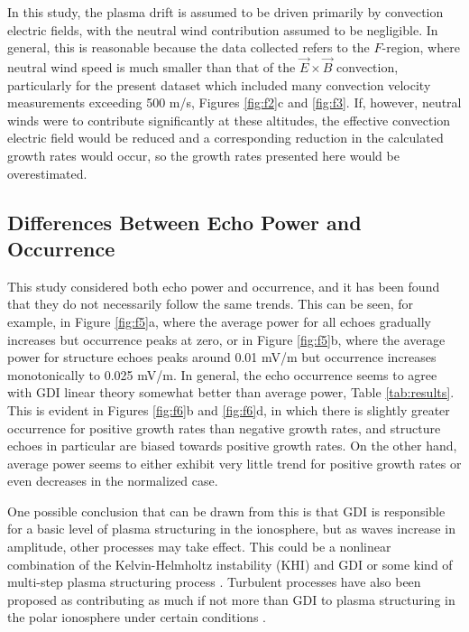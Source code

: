 In this study, the plasma drift is assumed to be driven primarily by convection electric fields, with the neutral wind contribution assumed to be negligible.  In general, this is reasonable because the data collected refers to the \(F\)-region, where neutral wind speed is much smaller than that of the \(\vec{E}\times\vec{B}\) convection, particularly for the present dataset which included many convection velocity measurements exceeding 500 m/s, Figures \ref{fig:f2}c and \ref{fig:f3}.  If, however, neutral winds were to contribute significantly at these altitudes, the effective convection electric field would be reduced and a corresponding reduction in the calculated growth rates would occur, so the growth rates presented here would be overestimated.


\subsection{Differences Between Echo Power and Occurrence}
\label{sec:discussion3}
This study considered both echo power and occurrence, and it has been found that they do not necessarily follow the same trends.  This can be seen, for example, in Figure \ref{fig:f5}a, where the average power for all echoes gradually increases but occurrence peaks at zero, or in Figure \ref{fig:f5}b, where the average power for structure echoes peaks around 0.01 mV/m but occurrence increases monotonically to 0.025 mV/m.  In general, the echo occurrence seems to agree with GDI linear theory somewhat better than average power, Table \ref{tab:results}.  This is evident in Figures \ref{fig:f6}b and \ref{fig:f6}d, in which there is slightly greater occurrence for positive growth rates than negative growth rates, and structure echoes in particular are biased towards positive growth rates.  On the other hand, average power seems to either exhibit very little trend for positive growth rates or even decreases in the normalized case.

One possible conclusion that can be drawn from this is that GDI is responsible for a basic level of plasma structuring in the ionosphere, but as waves increase in amplitude, other processes may take effect.  This could be a nonlinear combination of the Kelvin-Helmholtz instability (KHI) and GDI \citep{Gondarenko2006} or some kind of multi-step plasma structuring process \citep{Carlson2007,Carlson2008}.  Turbulent processes have also been proposed as contributing as much if not more than GDI to plasma structuring in the polar ionosphere under certain conditions \citep{Burston2010,Spicher2015,Burston2016}.

